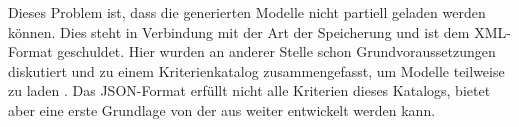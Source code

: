 Dieses Problem ist, dass die generierten Modelle nicht partiell geladen werden können. Dies steht in Verbindung mit der Art der Speicherung und ist dem XML-Format geschuldet. Hier wurden an anderer Stelle schon Grundvoraussetzungen diskutiert und zu einem Kriterienkatalog zusammengefasst, um Modelle teilweise zu laden \cite{kolovos2013research}. Das JSON-Format erfüllt nicht alle Kriterien dieses Katalogs, bietet aber eine erste Grundlage von der aus weiter entwickelt werden kann.